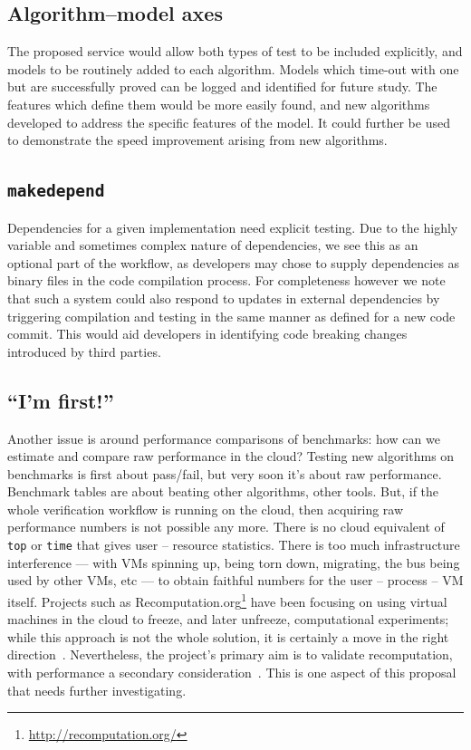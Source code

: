 \documentclass[conference]{IEEEtran}
\begin{document}
\subsection{Algorithm--model axes}

The proposed service would allow both types of test to be included
explicitly, and models to be routinely added to each algorithm. Models
which time-out with one but are successfully proved can be logged and
identified for future study.  The features which define them would be
more easily found, and new algorithms developed to address the
specific features of the model. It could further be used to
demonstrate the speed improvement arising from new algorithms.

\subsection{{\texttt{makedepend}}}

Dependencies for a given implementation need explicit testing. Due to
the highly variable and sometimes complex nature of dependencies, we
see this as an optional part of the workflow, as developers may chose
to supply dependencies as binary files in the code compilation
process. For completeness however we note that such a system could
also respond to updates in external dependencies by triggering
compilation and testing in the same manner as defined for a new code
commit. This would aid developers in identifying code breaking changes
introduced by third parties.

\subsection{``I'm first!''}

Another issue is around performance comparisons of benchmarks: how can
we estimate and compare raw performance in the cloud? Testing new
algorithms on benchmarks is first about pass/fail, but very soon it's
about raw performance. Benchmark tables are about beating other
algorithms, other tools. But, if the whole verification workflow is
running on the cloud, then acquiring raw performance numbers is not
possible any more. There is no cloud equivalent of {\texttt{top}} or
{\texttt{time}} that gives user -- resource statistics. There is too
much infrastructure interference --- with VMs spinning up, being torn
down, migrating, the bus being used by other VMs, etc --- to obtain
faithful numbers for the user -- process -- VM itself. Projects such
as Recomputation.org\footnote{\url{http://recomputation.org/}}
have been focusing on using virtual machines in the cloud to freeze,
and later unfreeze, computational experiments; while this approach is
not the whole solution, it is certainly a move in the right
direction~\cite{arabas-et-al:2014}. Nevertheless, the project's
primary aim is to validate recomputation, with performance a secondary
consideration~\cite{gent:2013}. This is one aspect of this proposal
that needs further investigating.
\end{document}
